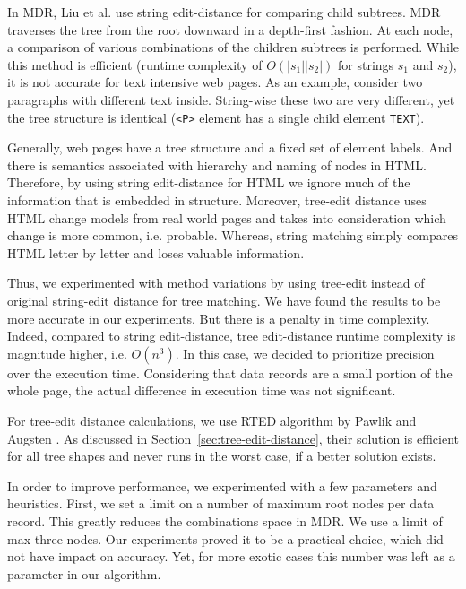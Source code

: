 In MDR, Liu et al. \cite{liu2009a} use string edit-distance for comparing child subtrees. MDR traverses the tree from the root downward in a depth-first fashion. At each node, a  comparison of various combinations of the children subtrees is performed. While this method is efficient (runtime complexity of $O(|s_1||s_2|)$ for strings $s_1$ and $s_2$), it is not accurate for text intensive web pages. As an example, consider two paragraphs with different text inside. String-wise these two are very different, yet the tree structure is identical (\texttt{<P>} element has a single child element \texttt{TEXT}).

Generally, web pages have a tree structure and a fixed set of element labels. And there is semantics associated with hierarchy and naming of nodes in HTML. Therefore, by using string edit-distance for HTML we ignore much of the information that is embedded in structure. Moreover, tree-edit distance uses HTML change models from real world pages and takes into consideration which change is more common, i.e. probable. Whereas, string matching simply compares HTML letter by letter and loses valuable information.

Thus, we experimented with method variations by using tree-edit instead of original string-edit distance for tree matching. We have found the results to be more accurate in our experiments. But there is a penalty in time complexity. Indeed, compared to string edit-distance, tree edit-distance runtime complexity is magnitude higher, i.e. $O(n^3)$. In this case, we decided to prioritize precision over the execution time. Considering that data records are a small portion of the whole page, the actual difference in execution time was not significant.

For tree-edit distance calculations, we use RTED algorithm by Pawlik and Augsten \cite{pawlik2011a}. As discussed in Section~\ref{sec:tree-edit-distance}, their solution is efficient for all tree shapes and never runs in the worst case, if a better solution exists.

In order to improve performance, we experimented with a few parameters and heuristics. First, we set a limit on a number of maximum root nodes per data record. This greatly reduces the combinations space in MDR. We use a limit of max three nodes. Our experiments proved it to be a practical choice, which did not have impact on accuracy. Yet, for more exotic cases this number was left as a parameter in our algorithm.

